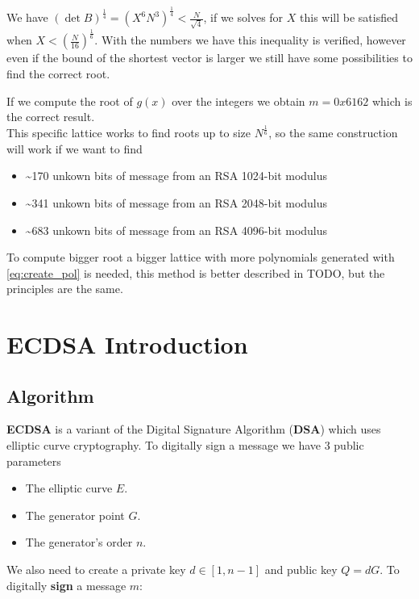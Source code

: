 \documentclass[a4paper,12pt]{report}
\begin{document}
We have $(\det B)^{\frac{1}{4}} = (X^6N^3)^{\frac{1}{4}} < \frac{N}{\sqrt{4}}$, if we solves for $X$ this will be satisfied when $X < (\frac{N}{16})^{\frac{1}{6}}$.
With the numbers we have this inequality is verified, however even if the bound of the shortest vector is larger we still have some possibilities to
find the correct root.

If we compute the root of $g(x)$ over the integers we obtain $m = 0x6162$ which is the correct result.\\

This specific lattice works to find roots up to size $N^{\frac{1}{6}}$, so the same construction will work if we want to find

\begin{itemize}
    \item \textasciitilde 170 unkown bits of message from an RSA 1024-bit modulus
    \item \textasciitilde 341 unkown bits of message from an RSA 2048-bit modulus
    \item \textasciitilde 683 unkown bits of message from an RSA 4096-bit modulus
\end{itemize}

To compute bigger root a bigger lattice with more polynomials generated with \ref{eq:create_pol} is needed,
this method is better described in TODO, but the principles are the same.

\section{ECDSA Introduction}

\subsection{Algorithm}

\textbf{ECDSA} is a variant of the Digital Signature Algorithm (\textbf{DSA}) which uses elliptic curve cryptography.
To digitally sign a message we have 3 public parameters

\begin{itemize}
    \item The elliptic curve \textbf{$E$}.
    \item The generator point \textbf{$G$}.
    \item The generator's order \textbf{$n$}.
\end{itemize}

We also need to create a private key $d \in [1, n-1]$ and public key $Q = dG$. To digitally \textbf{sign} a message $m$:
\end{document}
